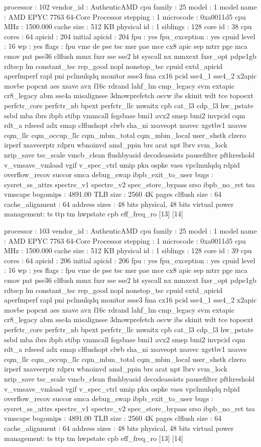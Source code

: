 processor	: 102
vendor_id	: AuthenticAMD
cpu family	: 25
model		: 1
model name	: AMD EPYC 7763 64-Core Processor
stepping	: 1
microcode	: 0xa0011d5
cpu MHz		: 1500.000
cache size	: 512 KB
physical id	: 1
siblings	: 128
core id		: 38
cpu cores	: 64
apicid		: 204
initial apicid	: 204
fpu		: yes
fpu_exception	: yes
cpuid level	: 16
wp		: yes
flags		: fpu vme de pse tsc msr pae mce cx8 apic sep mtrr pge mca cmov pat pse36 clflush mmx fxsr sse sse2 ht syscall nx mmxext fxsr_opt pdpe1gb rdtscp lm constant_tsc rep_good nopl nonstop_tsc cpuid extd_apicid aperfmperf rapl pni pclmulqdq monitor ssse3 fma cx16 pcid sse4_1 sse4_2 x2apic movbe popcnt aes xsave avx f16c rdrand lahf_lm cmp_legacy svm extapic cr8_legacy abm sse4a misalignsse 3dnowprefetch osvw ibs skinit wdt tce topoext perfctr_core perfctr_nb bpext perfctr_llc mwaitx cpb cat_l3 cdp_l3 hw_pstate ssbd mba ibrs ibpb stibp vmmcall fsgsbase bmi1 avx2 smep bmi2 invpcid cqm rdt_a rdseed adx smap clflushopt clwb sha_ni xsaveopt xsavec xgetbv1 xsaves cqm_llc cqm_occup_llc cqm_mbm_total cqm_mbm_local user_shstk clzero irperf xsaveerptr rdpru wbnoinvd amd_ppin brs arat npt lbrv svm_lock nrip_save tsc_scale vmcb_clean flushbyasid decodeassists pausefilter pfthreshold v_vmsave_vmload vgif v_spec_ctrl umip pku ospke vaes vpclmulqdq rdpid overflow_recov succor smca debug_swap ibpb_exit_to_user
bugs		: sysret_ss_attrs spectre_v1 spectre_v2 spec_store_bypass srso ibpb_no_ret tsa vmscape
bogomips	: 4891.00
TLB size	: 2560 4K pages
clflush size	: 64
cache_alignment	: 64
address sizes	: 48 bits physical, 48 bits virtual
power management: ts ttp tm hwpstate cpb eff_freq_ro [13] [14]

processor	: 103
vendor_id	: AuthenticAMD
cpu family	: 25
model		: 1
model name	: AMD EPYC 7763 64-Core Processor
stepping	: 1
microcode	: 0xa0011d5
cpu MHz		: 1500.000
cache size	: 512 KB
physical id	: 1
siblings	: 128
core id		: 39
cpu cores	: 64
apicid		: 206
initial apicid	: 206
fpu		: yes
fpu_exception	: yes
cpuid level	: 16
wp		: yes
flags		: fpu vme de pse tsc msr pae mce cx8 apic sep mtrr pge mca cmov pat pse36 clflush mmx fxsr sse sse2 ht syscall nx mmxext fxsr_opt pdpe1gb rdtscp lm constant_tsc rep_good nopl nonstop_tsc cpuid extd_apicid aperfmperf rapl pni pclmulqdq monitor ssse3 fma cx16 pcid sse4_1 sse4_2 x2apic movbe popcnt aes xsave avx f16c rdrand lahf_lm cmp_legacy svm extapic cr8_legacy abm sse4a misalignsse 3dnowprefetch osvw ibs skinit wdt tce topoext perfctr_core perfctr_nb bpext perfctr_llc mwaitx cpb cat_l3 cdp_l3 hw_pstate ssbd mba ibrs ibpb stibp vmmcall fsgsbase bmi1 avx2 smep bmi2 invpcid cqm rdt_a rdseed adx smap clflushopt clwb sha_ni xsaveopt xsavec xgetbv1 xsaves cqm_llc cqm_occup_llc cqm_mbm_total cqm_mbm_local user_shstk clzero irperf xsaveerptr rdpru wbnoinvd amd_ppin brs arat npt lbrv svm_lock nrip_save tsc_scale vmcb_clean flushbyasid decodeassists pausefilter pfthreshold v_vmsave_vmload vgif v_spec_ctrl umip pku ospke vaes vpclmulqdq rdpid overflow_recov succor smca debug_swap ibpb_exit_to_user
bugs		: sysret_ss_attrs spectre_v1 spectre_v2 spec_store_bypass srso ibpb_no_ret tsa vmscape
bogomips	: 4891.00
TLB size	: 2560 4K pages
clflush size	: 64
cache_alignment	: 64
address sizes	: 48 bits physical, 48 bits virtual
power management: ts ttp tm hwpstate cpb eff_freq_ro [13] [14]

